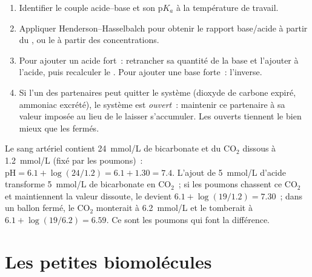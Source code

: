 \begin{method}\label{met:b1:water-small-molecules:bufferarith}
\begin{enumerate}
  \item Identifier le couple acide--base et son p$K_a$ à la température
        de travail.
  \item Appliquer Henderson--Hasselbalch pour obtenir le rapport
        base/acide à partir du , ou le  à partir des concentrations.
  \item Pour ajouter un acide fort~: retrancher sa quantité de la base
        et l'ajouter à l'acide, puis recalculer le . Pour ajouter une
        base forte~: l'inverse.
  \item Si l'un des partenaires peut quitter le système (dioxyde de
        carbone expiré, ammoniac excrété), le système est
        \emph{ouvert}~: maintenir ce partenaire à sa valeur imposée au
        lieu de le laisser s'accumuler. Les  ouverts tiennent le
         bien mieux que les  fermés.
\end{enumerate}
\end{method}

\begin{example}[Le sang]\label{ex:b1:water-small-molecules:blood}
Le sang artériel contient \qty{24}{mmol/L} de bicarbonate et du
$\mathrm{CO_2}$ dissous à \qty{1.2}{mmol/L} (fixé par les poumons)~: $\mathrm{pH} =
6.1 + \log(24/1.2) = 6.1 + 1.30 = 7.4$. L'ajout de \qty{5}{mmol/L}
d'acide transforme \qty{5}{mmol/L} de bicarbonate en $\mathrm{CO_2}$~;
si les poumons chassent ce $\mathrm{CO_2}$ et maintiennent la valeur
dissoute, le  devient $6.1 + \log(19/1.2) = 7.30$~; dans un ballon
fermé, le $\mathrm{CO_2}$ monterait à \qty{6.2}{mmol/L} et le 
tomberait à $6.1 + \log(19/6.2) =
6.59$. Ce sont les poumons qui font la différence.
\end{example}

\section{Les petites biomolécules}

